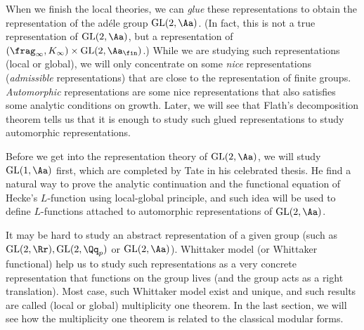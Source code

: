 When we finish the local theories, we can \emph{glue} these representations to obtain the representation of the ad\'ele group $\GL(2, \Aa)$. (In fact, this is not a true representation of $\GL(2, \Aa)$, but a representation of $(\frag_{\infty}, K_{\infty}) \times \GL(2, \Aa_{\fin})$.) 
While we are studying such representations (local or global), we will only concentrate on some \emph{nice} representations (\emph{admissible} representations) that are close to the representation of finite groups. 
\emph{Automorphic} representations are some nice representations that also satisfies some analytic conditions on growth. 
Later, we will see that Flath's decomposition theorem tells us that it is enough to study such glued representations to study automorphic representations. 

Before we get into the representation theory of $\GL(2, \Aa)$, we will study $\GL(1, \Aa)$ first, which are  completed by Tate in his celebrated thesis. He find a natural way to prove the analytic continuation and the functional equation of Hecke's $L$-function using local-global principle, and such idea will be used to define $L$-functions attached to automorphic representations of $\GL(2,\Aa)$. 

It may be hard to study an abstract representation of a given group (such as $\GL(2, \Rr), \GL(2, \Qq_{p})$ or $\GL(2, \Aa)$). 
Whittaker model (or Whittaker functional) help us to study such representations as a very concrete representation that functions on the group lives (and the group acts as a right translation). 
Most case, such Whittaker model exist and unique, and such results are called (local or global) multiplicity one theorem. 
In the last section, we will see how the multiplicity one theorem is related to the classical modular forms. 

